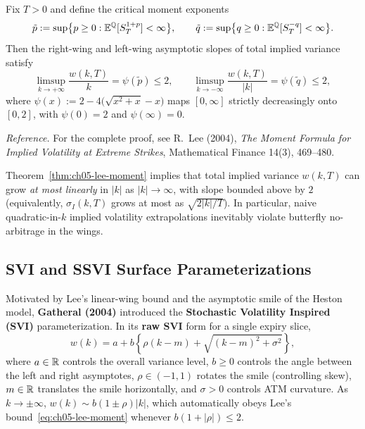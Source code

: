 \begin{theorem}
    \label{thm:ch05-lee-moment}
    Fix $T > 0$ and define the critical moment exponents
    \[
        \tilde{p} := \sup\bigl\{p \ge 0 : \mathbb{E}^{\mathbb{Q}}[S_T^{1+p}] < \infty\bigr\}, \qquad
        \tilde{q} := \sup\bigl\{q \ge 0 : \mathbb{E}^{\mathbb{Q}}[S_T^{-q}] < \infty\bigr\}.
    \]
    Then the right-wing and left-wing asymptotic slopes of total implied variance satisfy
    \begin{equation}
        \label{eq:ch05-lee-moment}
        \limsup_{k \to +\infty} \frac{w(k, T)}{k} = \psi(\tilde{p}) \le 2, \qquad
        \limsup_{k \to -\infty} \frac{w(k, T)}{|k|} = \psi(\tilde{q}) \le 2,
    \end{equation}
    where $\psi(x) := 2 - 4\bigl(\sqrt{x^2 + x} - x\bigr)$ maps $[0, \infty]$ strictly decreasingly onto $[0, 2]$, with $\psi(0) = 2$ and $\psi(\infty) = 0$.
\end{theorem}
\noindent\emph{Reference.} For the complete proof, see R.~Lee (2004), \emph{The Moment Formula for Implied Volatility at Extreme Strikes}, Mathematical Finance 14(3), 469--480.

Theorem~\ref{thm:ch05-lee-moment} implies that total implied variance $w(k, T)$ can grow \emph{at most linearly} in $|k|$ as $|k| \to \infty$, with slope bounded above by $2$ (equivalently, $\sigma_I(k, T)$ grows at most as $\sqrt{2|k|/T}$). In particular, naive quadratic-in-$k$ implied volatility extrapolations inevitably violate butterfly no-arbitrage in the wings.

\subsection{SVI and SSVI Surface Parameterizations}
\label{sec:ch05-svi}
Motivated by Lee's linear-wing bound and the asymptotic smile of the Heston model, \textbf{Gatheral (2004)} introduced the \textbf{Stochastic Volatility Inspired (SVI)} parameterization. In its \textbf{raw SVI} form for a single expiry slice,
\begin{equation}
    \label{eq:ch05-raw-svi}
    w(k) = a + b\left\{\rho(k - m) + \sqrt{(k - m)^2 + \sigma^2}\right\},
\end{equation}
where $a \in \mathbb{R}$ controls the overall variance level, $b \ge 0$ controls the angle between the left and right asymptotes, $\rho \in (-1, 1)$ rotates the smile (controlling skew), $m \in \mathbb{R}$ translates the smile horizontally, and $\sigma > 0$ controls ATM curvature. As $k \to \pm\infty$, $w(k) \sim b(1 \pm \rho)|k|$, which automatically obeys Lee's bound~\eqref{eq:ch05-lee-moment} whenever $b(1 + |\rho|) \le 2$.

